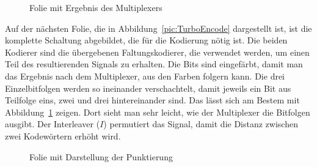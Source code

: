 \begin{figure}[th]
\centering
{}
\caption{Folie mit Ergebnis des Multiplexers}
\label{pic:TurboEncodeMultiplexer}
\end{figure}  

Auf der nächsten Folie, die in Abbildung~\ref{pic:TurboEncode} dargestellt ist, ist die komplette Schaltung abgebildet, die für die Kodierung nötig ist. Die beiden Kodierer sind die übergebenen Faltungskodierer, die verwendet werden, um einen Teil des resultierenden Signals zu erhalten. Die Bits sind eingefärbt, damit man das Ergebnis nach dem Multiplexer, aus den Farben folgern kann. Die drei Einzelbitfolgen werden so ineinander verschachtelt, damit jeweils ein Bit aus Teilfolge eins, zwei und drei hintereinander sind. Das lässt sich am Bestem mit Abbildung~\ref{pic:TurboEncodeMultiplexer} zeigen. Dort sieht man sehr leicht, wie der Multiplexer die Bitfolgen ausgibt. Der Interleaver ($I$) permutiert das Signal, damit die Distanz zwischen zwei Kodewörtern erhöht wird.

\begin{figure}[th]
\centering
{}
\caption{Folie mit Darstellung der Punktierung}
\label{pic:TurboEncodePuncturing}
\end{figure}  

